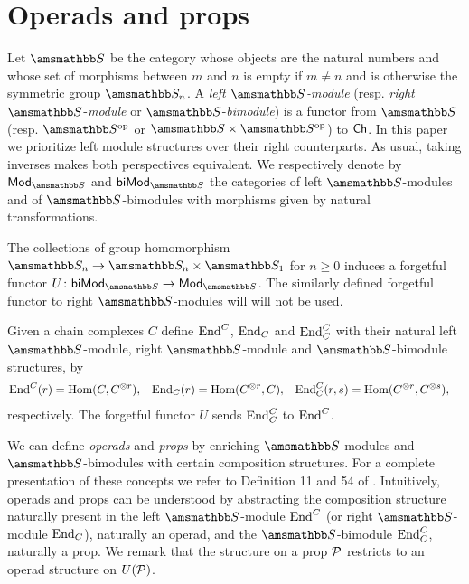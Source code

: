 
\section{Operads and props} \label{s:operads and props}

Let $\S$ be the category whose objects are the natural numbers and whose set of morphisms between $m$ and $n$ is empty if $m \neq n$ and is otherwise the symmetric group $\S_n$.
A \textit{left $\S$-module} (resp. \textit{right} $\S$-\textit{module} or $\S$-\textit{bimodule}) is a functor from $\S$ (resp. $\S^\op$ or $\S \times \S^\op$) to $\Ch$.
In this paper we prioritize left module structures over their right counterparts. As usual, taking inverses makes both perspectives equivalent.
We respectively denote by $\smod$ and $\sbimod$ the categories of left $\S$-modules and of $\S$-bimodules with morphisms given by natural transformations.

The collections of group homomorphism $\S_n \to \S_n \times \S_1$ for $n \geq 0$ induces a forgetful functor $U \colon \sbimod \to \smod$.
The similarly defined forgetful functor to right $\S$-modules will will not be used.

Given a chain complexes $C$ define $\End^C$, $\End_C$ and $\End_C^C$ with their natural left $\S$-module, right $\S$-module and $\S$-bimodule structures, by
\begin{align*}
\End^C(r) &= \Hom(C, C^{\otimes r}),
& \End_C(r) &= \Hom(C^{\otimes r}, C),
& \End^C_C(r, s) &= \Hom(C^{\otimes r}, C^{\otimes s}),
\end{align*}
respectively.
The forgetful functor $U$ sends $\End^C_C$ to $\End^C$.

We can define \textit{operads} and \textit{props} by enriching $\S$-modules and \mbox{$\S$-bimodules} with certain composition structures.
For a complete presentation of these concepts we refer to Definition 11 and 54 of \cite{Markl08}.
Intuitively, operads and props can be understood by abstracting the composition structure naturally present in the left $\S$-module $\End^C$ (or right $\S$-module $\End_C$), naturally an operad, and the $\S$-bimodule $\End^C_C$, naturally a prop.
We remark that the structure on a prop $\P$ restricts to an operad structure on $U(\P)$.

